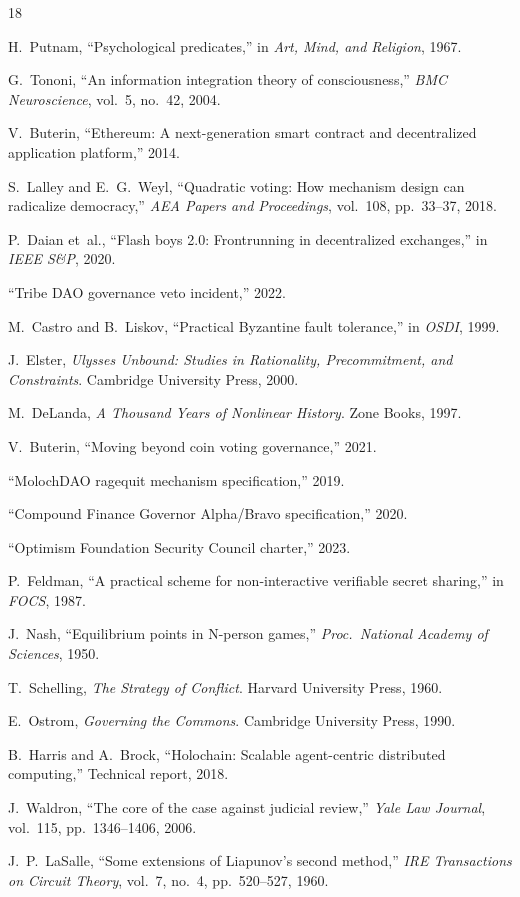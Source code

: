 \documentclass[11pt,a4paper]{article}
\begin{document}

\begin{thebibliography}{18}

 H.~Putnam, ``Psychological predicates,'' in \textit{Art, Mind, and Religion}, 1967.

 G.~Tononi, ``An information integration theory of consciousness,'' \textit{BMC Neuroscience}, vol.~5, no.~42, 2004.

 V.~Buterin, ``Ethereum: A next-generation smart contract and decentralized application platform,'' 2014.

 S.~Lalley and E.~G.~Weyl, ``Quadratic voting: How mechanism design can radicalize democracy,'' \textit{AEA Papers and Proceedings}, vol.~108, pp.~33--37, 2018.

 P.~Daian et~al., ``Flash boys 2.0: Frontrunning in decentralized exchanges,'' in \textit{IEEE S\&P}, 2020.

 ``Tribe DAO governance veto incident,'' 2022.

 M.~Castro and B.~Liskov, ``Practical Byzantine fault tolerance,'' in \textit{OSDI}, 1999.

 J.~Elster, \textit{Ulysses Unbound: Studies in Rationality, Precommitment, and Constraints}. Cambridge University Press, 2000.

 M.~DeLanda, \textit{A Thousand Years of Nonlinear History}. Zone Books, 1997.

 V.~Buterin, ``Moving beyond coin voting governance,'' 2021.

 ``MolochDAO ragequit mechanism specification,'' 2019.

 ``Compound Finance Governor Alpha/Bravo specification,'' 2020.

 ``Optimism Foundation Security Council charter,'' 2023.

 P.~Feldman, ``A practical scheme for non-interactive verifiable secret sharing,'' in \textit{FOCS}, 1987.

 J.~Nash, ``Equilibrium points in N-person games,'' \textit{Proc.\ National Academy of Sciences}, 1950.

 T.~Schelling, \textit{The Strategy of Conflict}. Harvard University Press, 1960.

 E.~Ostrom, \textit{Governing the Commons}. Cambridge University Press, 1990.

 B.~Harris and A.~Brock, ``Holochain: Scalable agent-centric distributed computing,'' Technical report, 2018.

 J.~Waldron, ``The core of the case against judicial review,'' \textit{Yale Law Journal}, vol.~115, pp.~1346--1406, 2006.

 J.~P.~LaSalle, ``Some extensions of Liapunov's second method,'' \textit{IRE Transactions on Circuit Theory}, vol.~7, no.~4, pp.~520--527, 1960.

\end{thebibliography}
\end{document}
